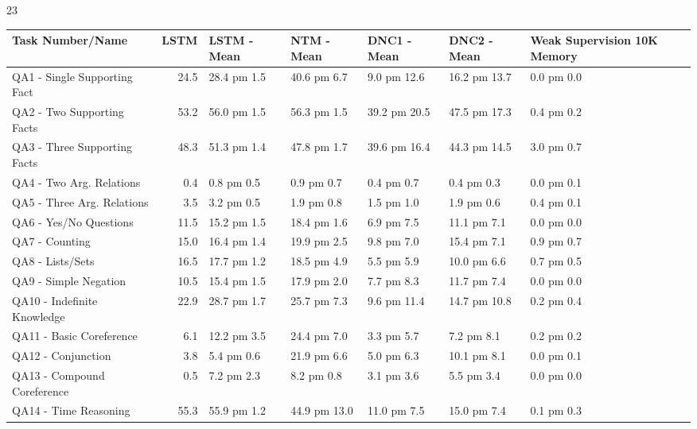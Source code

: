 23
\begin{tabular}{lrlllll}
\toprule
 Task Number/Name             &   LSTM & LSTM - Mean   & NTM - Mean   & DNC1 - Mean   & DNC2 - Mean   & Weak Supervision 10K Memory   \\
\midrule
 QA1 - Single Supporting Fact &   24.5 & 28.4 pm 1.5   & 40.6 pm 6.7  & 9.0 pm 12.6   & 16.2 pm 13.7  & 0.0 pm 0.0                    \\
 QA2 - Two Supporting Facts   &   53.2 & 56.0 pm 1.5   & 56.3 pm 1.5  & 39.2 pm 20.5  & 47.5 pm 17.3  & 0.4 pm 0.2                    \\
 QA3 - Three Supporting Facts &   48.3 & 51.3 pm 1.4   & 47.8 pm 1.7  & 39.6 pm 16.4  & 44.3 pm 14.5  & 3.0 pm 0.7                    \\
 QA4 - Two Arg. Relations     &    0.4 & 0.8 pm 0.5    & 0.9 pm 0.7   & 0.4 pm 0.7    & 0.4 pm 0.3    & 0.0 pm 0.1                    \\
 QA5 - Three Arg. Relations   &    3.5 & 3.2 pm 0.5    & 1.9 pm 0.8   & 1.5 pm 1.0    & 1.9 pm 0.6    & 0.4 pm 0.1                    \\
 QA6 - Yes/No Questions       &   11.5 & 15.2 pm 1.5   & 18.4 pm 1.6  & 6.9 pm 7.5    & 11.1 pm 7.1   & 0.0 pm 0.0                    \\
 QA7 - Counting               &   15.0 & 16.4 pm 1.4   & 19.9 pm 2.5  & 9.8 pm 7.0    & 15.4 pm 7.1   & 0.9 pm 0.7                    \\
 QA8 - Lists/Sets             &   16.5 & 17.7 pm 1.2   & 18.5 pm 4.9  & 5.5 pm 5.9    & 10.0 pm 6.6   & 0.7 pm 0.5                    \\
 QA9 - Simple Negation        &   10.5 & 15.4 pm 1.5   & 17.9 pm 2.0  & 7.7 pm 8.3    & 11.7 pm 7.4   & 0.0 pm 0.0                    \\
 QA10 - Indefinite Knowledge  &   22.9 & 28.7 pm 1.7   & 25.7 pm 7.3  & 9.6 pm 11.4   & 14.7 pm 10.8  & 0.2 pm 0.4                    \\
 QA11 - Basic Coreference     &    6.1 & 12.2 pm 3.5   & 24.4 pm 7.0  & 3.3 pm 5.7    & 7.2 pm 8.1    & 0.2 pm 0.2                    \\
 QA12 - Conjunction           &    3.8 & 5.4 pm 0.6    & 21.9 pm 6.6  & 5.0 pm 6.3    & 10.1 pm 8.1   & 0.0 pm 0.1                    \\
 QA13 - Compound Coreference  &    0.5 & 7.2 pm 2.3    & 8.2 pm 0.8   & 3.1 pm 3.6    & 5.5 pm 3.4    & 0.0 pm 0.0                    \\
 QA14 - Time Reasoning        &   55.3 & 55.9 pm 1.2   & 44.9 pm 13.0 & 11.0 pm 7.5   & 15.0 pm 7.4   & 0.1 pm 0.3                    \\

\end{tabular}
